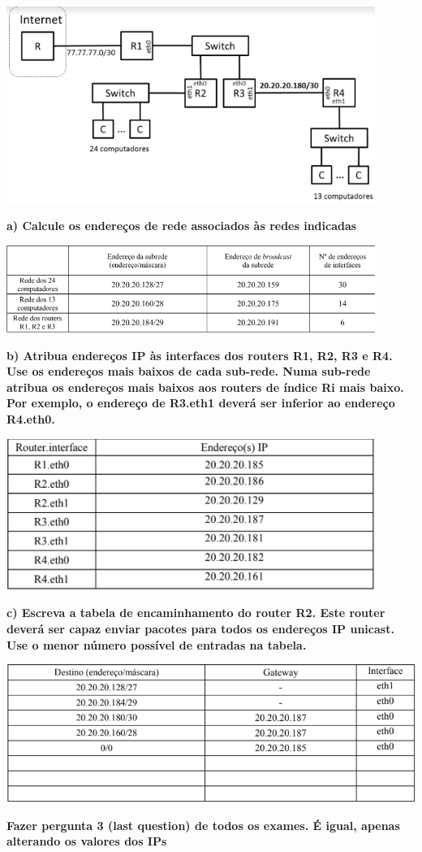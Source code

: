 \documentclass{article}
\begin{document}
\begin{center}
    \includegraphics[width=12cm]{images/RCOM40.png}
\end{center}
\textbf{a) Calcule os endereços de rede associados às redes indicadas}
\begin{center}
    \includegraphics[width=12cm]{images/RCOM41.png}
\end{center}
\textbf{b) Atribua endereços IP às interfaces dos routers R1, R2, R3 e R4. Use os endereços mais baixos de cada sub-rede. Numa sub-rede atribua os endereços mais baixos aos routers de índice Ri mais baixo. Por exemplo, o endereço de R3.eth1 deverá ser inferior ao endereço R4.eth0.}
\begin{center}
    \includegraphics[width=12cm]{images/RCOM42.png}
\end{center}
\textbf{c) Escreva a tabela de encaminhamento do router R2. Este router deverá ser capaz enviar pacotes para todos os endereços IP unicast. Use o menor número possível de entradas na tabela.}
\begin{center}
    \includegraphics[width=14cm]{images/RCOM43.png}
\end{center}
\textbf{Fazer pergunta 3 (last question) de todos os exames. É igual, apenas alterando os valores dos IPs}
\end{document}
